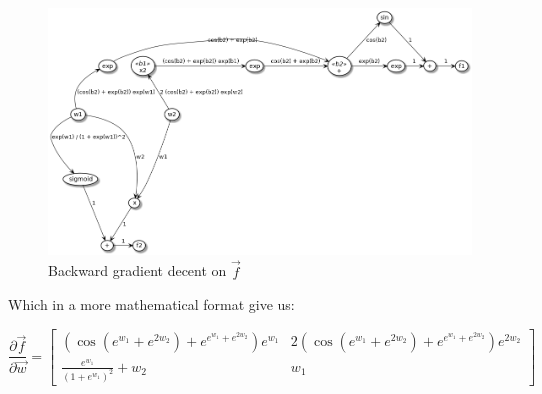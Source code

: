 

\begin{figure}[h!]
    \begin{center}
        \includegraphics[width=\textwidth]{../2_automatocDifferentiation/computation_graph_backward.png}
        \caption{Backward gradient decent on $\vec{f}$}
    \end{center}
\end{figure}

Which in a more mathematical format give us:

\[
    \frac{\partial \vec{f}}{\partial \vec{w}} =
    \begin{bmatrix}
        ( \cos(e^{w_1} + e^{2 w_2}) + e^{e^{w_1} + e^{2 w_2}} ) e^{w_1}   &   2 ( \cos(e^{w_1} + e^{2 w_2}) + e^{e^{w_1} + e^{2 w_2}} ) e^{2 w_2} \\
        \frac{e^{w_1}}{(1 + e^{w_1})^2} + w_2                             &   w_1
    \end{bmatrix}
\]
